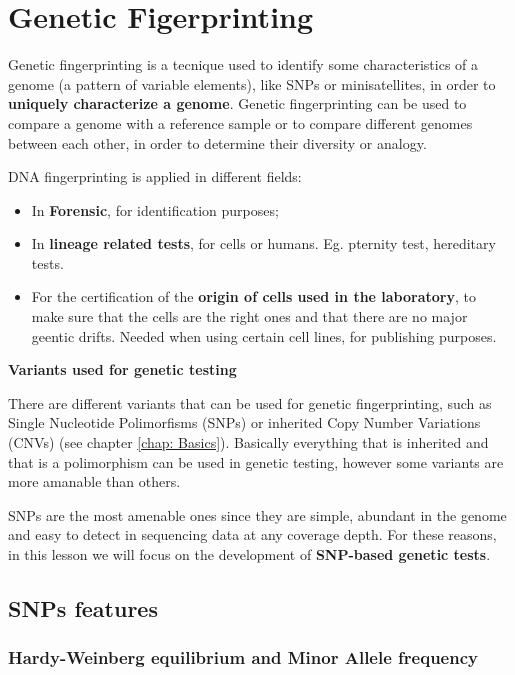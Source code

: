 \graphicspath{{chapters/GeneticFingImages/}}
\chapter{Genetic Figerprinting}

Genetic fingerprinting is a tecnique used to identify some characteristics of a
genome (a pattern of variable elements), like SNPs or minisatellites, in order
to \textbf{uniquely characterize a genome}. Genetic fingerprinting can be used
to compare a genome with a reference sample or to compare different genomes
between each other, in order to determine their diversity or analogy. 

DNA fingerprinting is applied in different fields:

\begin{itemize}
	\item In \textbf{Forensic}, for identification purposes;
	\item In \textbf{lineage related tests}, for cells or humans. Eg. pternity
	test, hereditary tests.
	\item For the certification of the \textbf{origin of cells used in the
	laboratory}, to make sure that the cells are the right ones and that there
	are no major geentic drifts. Needed when using certain cell lines, for
	publishing purposes.
\end{itemize}


\textbf{Variants used for genetic testing}

There are different variants that can be used for genetic fingerprinting, such
as Single Nucleotide Polimorfisms (SNPs) or inherited Copy Number Variations
(CNVs) (see chapter \ref{chap: Basics}). Basically everything that is inherited
and that is a polimorphism can be used in genetic testing, however some variants
are more amanable than others. 

SNPs are the most amenable ones since they are simple, abundant in the genome
and easy to detect in sequencing data at any coverage depth. For these reasons,
in this lesson we will focus on the development of \textbf{SNP-based genetic
tests}.

\section{SNPs features}

\subsection{Hardy-Weinberg equilibrium and Minor Allele frequency}

